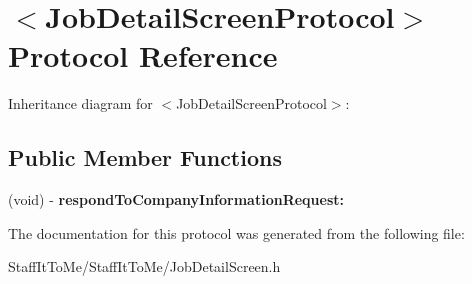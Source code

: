 \hypertarget{protocol_job_detail_screen_protocol-p}{
\section{$<$\-Job\-Detail\-Screen\-Protocol$>$ \-Protocol \-Reference}
\label{protocol_job_detail_screen_protocol-p}
}


\-Inheritance diagram for $<$\-Job\-Detail\-Screen\-Protocol$>$\-:
\subsection*{\-Public \-Member \-Functions}
\begin{DoxyCompactItemize}
\item 
\hypertarget{protocol_job_detail_screen_protocol-p_a530cb5922a204bca7ca744732ff1eafc}{
(void) -\/ {\bfseries respond\-To\-Company\-Information\-Request\-:}}
\label{protocol_job_detail_screen_protocol-p_a530cb5922a204bca7ca744732ff1eafc}

\end{DoxyCompactItemize}


\-The documentation for this protocol was generated from the following file\-:\begin{DoxyCompactItemize}
\item 
\-Staff\-It\-To\-Me/\-Staff\-It\-To\-Me/\-Job\-Detail\-Screen.\-h\end{DoxyCompactItemize}
